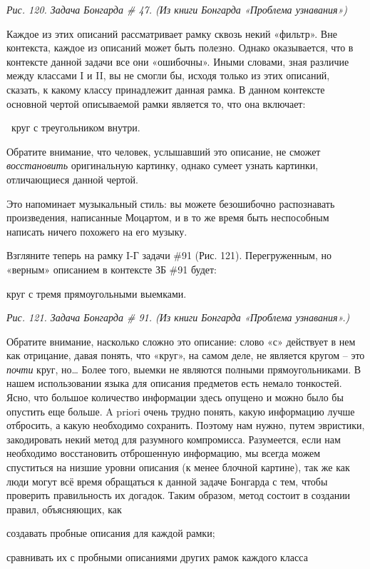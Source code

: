 \documentclass[../main.tex]{subfiles}
\begin{document}
\emph{Рис. 120. Задача Бонгарда \# 47. (Из книги Бонгарда «Проблема узнавания»)}

Каждое из этих описаний рассматривает рамку сквозь некий «фильтр». Вне контекста, каждое из описаний может быть полезно. Однако оказывается, что в контексте данной задачи все они «ошибочны». Иными словами, зная различие между классами I и II, вы не смогли бы, исходя только из этих описаний, сказать, к какому классу принадлежит данная рамка. В данном контексте основной чертой описываемой рамки является то, что она включает:

~круг с треугольником внутри.

Обратите внимание, что человек, услышавший это описание, не сможет \emph{восстановить} оригинальную картинку, однако сумеет узнать картинки, отличающиеся данной чертой.

Это напоминает музыкальный стиль: вы можете безошибочно распознавать произведения, написанные Моцартом, и в то же время быть неспособным написать ничего похожего на его музыку.

Взгляните теперь на рамку I-Г задачи \#91 (Рис. 121). Перегруженным, но «верным» описанием в контексте ЗБ \#91 будет:

круг с тремя прямоугольными выемками.

\emph{Рис. 121. Задача Бонгарда \# 91. (Из книги Бонгарда «Проблема узнавания».)}

Обратите внимание, насколько сложно это описание: слово «с» действует в нем как отрицание, давая понять, что «круг», на самом деле, не является кругом \--- это \emph{почти} круг, но\ldots{} Более того, выемки не являются полными прямоугольниками. В нашем использовании языка для описания предметов есть немало тонкостей. Ясно, что большое количество информации здесь опущено и можно было бы опустить еще больше. A priori очень трудно понять, какую информацию лучше отбросить, а какую необходимо сохранить. Поэтому нам нужно, путем эвристики, закодировать некий метод для разумного компромисса. Разумеется, если нам необходимо восстановить отброшенную информацию, мы всегда можем спуститься на низшие уровни описания (к менее блочной картине), так же как люди могут всё время обращаться к данной задаче Бонгарда с тем, чтобы проверить правильность их догадок. Таким образом, метод состоит в создании правил, объясняющих, как

создавать пробные описания для каждой рамки;

сравнивать их с пробными описаниями других рамок каждого класса
\end{document}
